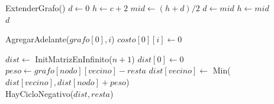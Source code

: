 \begin{algorithm}[H]
\begin{algorithmic}
    
	\State ExtenderGrafo()    
    \State $d \gets 0$    
	\State $h \gets c + 2$    
	    
		\State $mid \gets (h + d)/2$    
		    
			\State $d \gets mid$    
		\Else
			\State $h \gets mid$     \\
		\EndIf
	\EndWhile
	\Return $d$    
\EndFunction
\end{algorithmic}
\end{algorithm}

\begin{algorithm}[H]
\begin{algorithmic}
    
	\For{$i \in [1..n)$}    
		\State AgregarAdelante($grafo[0], i$)    
		\State $costo[0][i] \gets 0$    
	\EndFor
\EndFunction
\end{algorithmic}
\end{algorithm}

\begin{algorithm}[H]
\begin{algorithmic}
    
	\State $dist \gets$ InitMatrizEnInfinito($n + 1$)    
	\State $dist[0] \gets 0$    
	\For{$i \in [1..n)$}    
		    
			    
				\State $peso \gets grafo[nodo][vecino] - resta$    
				\State $dist[vecino] \gets$ Min($dist[vecino], dist[nodo] + peso$)      \\
			\EndFor
		\EndFor
	\EndFor
	\Return HayCicloNegativo($dist, resta$)    
\EndFunction
\end{algorithmic}
\end{algorithm}


